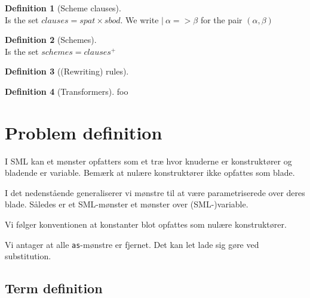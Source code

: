\documentclass[oneside]{memoir}
\theoremstyle{definition}
\newtheorem{definition}{Definition}
\begin{document}
\begin{definition}[Scheme clauses] \ \\
  Is the set $clauses = spat \times sbod$. We write $|\ \alpha => \beta$ for the pair
  $(\alpha, \beta)$
\end{definition}

\begin{definition}[Schemes] \ \\
  Is the set $schemes = clauses^{+}$
\end{definition}

\begin{definition}[(Rewriting) rules] \ \\
  
\end{definition}

\begin{definition}[Transformers]
  foo
\end{definition}


\section{Problem definition}

I SML kan et mønster opfatters som et træ hvor knuderne er konstruktører og
bladende er variable. Bemærk at nulære konstruktører ikke opfattes som blade.

I det nedenstående generaliserer vi mønstre til at være parametriserede over
deres blade. Således er et SML-mønster et mønster over (SML-)variable.

Vi følger konventionen at konstanter blot opfattes som nulære konstruktører.

Vi antager at alle \texttt{as}-mønstre er fjernet. Det kan let lade sig gøre ved
substitution.

\subsection{Term definition}
\label{sec:term-definition} 
\end{document}
